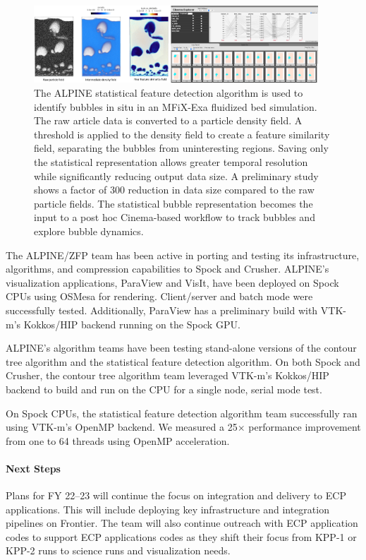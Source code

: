 \begin{figure}[htb]
	\begin{center}
		\includegraphics[width=0.95\textwidth]{projects/2.3.4-DataViz/2.3.4.16-ALPINE-ZFP/alpine-cinema-mfixexa-workflow.png}
		\caption{The ALPINE statistical feature detection algorithm is used to identify bubbles in situ in an MFiX-Exa fluidized bed simulation.  The raw article data is converted to a particle density field.  A threshold is applied to the density field to create a feature similarity field, separating the  bubbles from uninteresting regions.  Saving only the statistical representation allows greater temporal resolution while significantly reducing output data size.  A preliminary study shows a factor of 300 reduction in data size compared to the raw particle fields. The statistical bubble representation becomes the input to a post hoc Cinema-based workflow to track bubbles and explore bubble dynamics. }
		\label{fig:alpine-statistical-feature}
	\end{center}
\end{figure}

The ALPINE/ZFP team has been active in porting and testing its infrastructure, algorithms, and compression capabilities to Spock and Crusher.  ALPINE’s visualization applications, ParaView and VisIt, have been deployed on Spock CPUs using OSMesa for rendering.  Client/server and batch mode were successfully tested.  Additionally, ParaView has a preliminary build with VTK-m’s Kokkos/HIP backend running on the Spock GPU.  

ALPINE’s algorithm teams have been testing stand-alone versions of the contour tree algorithm and the statistical feature detection algorithm.  On both Spock and Crusher, the contour tree algorithm team leveraged VTK-m’s Kokkos/HIP backend to build and run on the CPU for a single node, serial mode test.  

On Spock CPUs, the statistical feature detection algorithm team successfully ran using VTK-m’s OpenMP backend.  We measured a 25$\times$ performance improvement from one to 64 threads using OpenMP acceleration.

\paragraph{Next Steps}

Plans for FY 22--23 will continue the focus on integration and delivery to ECP applications.  This will include deploying key infrastructure and integration pipelines on Frontier. The team will also continue outreach with ECP application codes to support ECP applications codes as they shift their focus from  KPP-1 or KPP-2 runs to science runs and visualization needs.  

